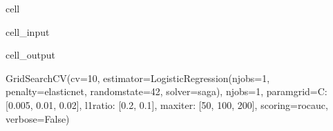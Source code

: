 \documentclass[letterpaper,10pt,english]{jupyterBook}
\begin{document}
\begin{sphinxuseclass}{cell}
\begin{sphinxVerbatimInput}
\begin{sphinxuseclass}{cell_input}
\end{sphinxuseclass}\end{sphinxVerbatimInput}
\begin{sphinxVerbatimOutput}

\begin{sphinxuseclass}{cell_output}
\begin{sphinxVerbatim}[commandchars=\\\{\}]
GridSearchCV(cv=10,
             estimator=LogisticRegression(n\PYGZus{}jobs=\PYGZhy{}1, penalty=\PYGZsq{}elasticnet\PYGZsq{},
                                          random\PYGZus{}state=42, solver=\PYGZsq{}saga\PYGZsq{}),
             n\PYGZus{}jobs=\PYGZhy{}1,
             param\PYGZus{}grid=\PYGZob{}\PYGZsq{}C\PYGZsq{}: [0.005, 0.01, 0.02], \PYGZsq{}l1\PYGZus{}ratio\PYGZsq{}: [0.2, 0.1],
                         \PYGZsq{}max\PYGZus{}iter\PYGZsq{}: [50, 100, 200]\PYGZcb{},
             scoring=\PYGZsq{}roc\PYGZus{}auc\PYGZsq{}, verbose=False)
\end{sphinxVerbatim}

\end{sphinxuseclass}\end{sphinxVerbatimOutput}

\end{sphinxuseclass}
\end{document}
